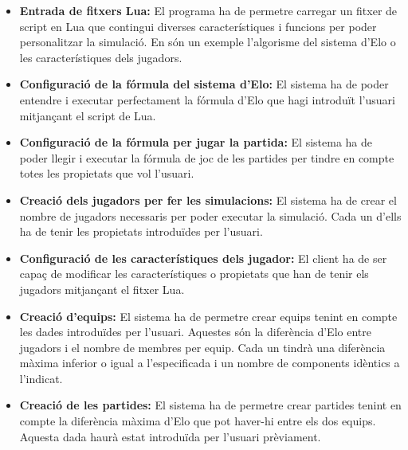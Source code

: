 \documentclass[a4paper]{article}
\begin{document}
\begin{itemize}
    \item \textbf{Entrada de fitxers Lua:} El programa ha de permetre carregar un fitxer de script en Lua que contingui diverses característiques i funcions per poder personalitzar la simulació. En són un exemple l'algorisme del sistema d'Elo o les característiques dels jugadors.
    
    \item \textbf{Configuració de la fórmula del sistema d'Elo:} El sistema ha de poder entendre i executar perfectament la fórmula d'Elo que hagi introduït l'usuari mitjançant el script de Lua. 
    
    \item \textbf{Configuració de la fórmula per jugar la partida:} El sistema ha de poder llegir i executar la fórmula de joc de les partides per tindre en compte totes les propietats que vol l'usuari.
    
    \item \textbf{Creació dels jugadors per fer les simulacions:} El sistema ha de crear el nombre de jugadors necessaris per poder executar la simulació. Cada un d'ells ha de tenir les propietats introduïdes per l'usuari.
    
    \item \textbf{Configuració de les característiques dels jugador:} El client ha de ser capaç de modificar les característiques o propietats que han de tenir els jugadors mitjançant el fitxer Lua.
    
    \item \textbf{Creació d'equips:} El sistema ha de permetre crear equips tenint en compte les dades introduïdes per l'usuari. Aquestes són la diferència d'Elo entre jugadors i el nombre de membres per equip. Cada un tindrà una diferència màxima inferior o igual a l'especificada i un nombre de components idèntics a l'indicat.
    
    \item \textbf{Creació de les partides:} El sistema ha de permetre crear partides tenint en compte la diferència màxima d'Elo que pot haver-hi entre els dos equips. Aquesta dada haurà estat introduïda per l'usuari prèviament.
    

    

\end{itemize}
\end{document}

